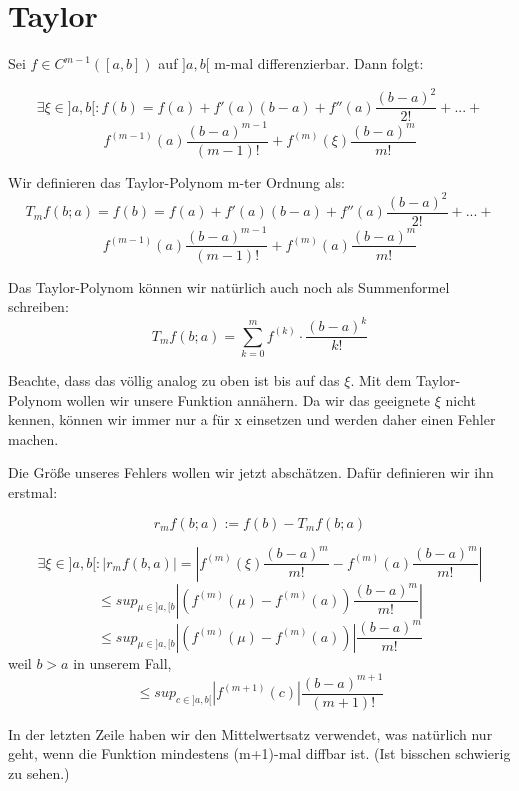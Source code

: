 \section{Taylor}

\begin{theorem}[Taylor]
Sei $f\in C^{m-1}([a,b])$ auf $]a,b[$ m-mal differenzierbar. Dann folgt:

$$\exists \xi \in ]a,b[:
f(b) = f(a) + f'(a)(b-a) + f''(a)\frac{(b-a)^2}{2!} + ... +$$
$$f^{(m-1)}(a)\frac{(b-a)^{m-1}}{(m-1)!} + f^{(m)}(\xi)\frac{(b-a)^m}{m!}$$
\end{theorem}

\begin{definition}
Wir definieren das Taylor-Polynom m-ter Ordnung als:
$$T_mf(b;a) = f(b) = f(a) + f'(a)(b-a) + f''(a)\frac{(b-a)^2}{2!} + ... +$$
$$f^{(m-1)}(a)\frac{(b-a)^{m-1}}{(m-1)!} + f^{(m)}(a)\frac{(b-a)^m}{m!}$$

Das Taylor-Polynom können wir natürlich auch noch als Summenformel schreiben:
$$T_mf(b;a) = \sum_{k=0}^m f^{(k)}\cdot\frac{(b-a)^k}{k!}$$

Beachte, dass das völlig analog zu oben ist bis auf das $\xi$.
Mit dem Taylor-Polynom wollen wir unsere Funktion annähern. Da wir das geeignete $\xi$ nicht kennen, können wir immer nur a für x einsetzen und werden daher einen Fehler machen.
\end{definition}

\begin{concept}
Die Größe unseres Fehlers wollen wir jetzt abschätzen.
Dafür definieren wir ihn erstmal:

$$r_mf(b;a) := f(b)-T_mf(b;a)$$

$$\exists \xi \in ]a,b[: |r_mf(b,a)| = |f^{(m)}(\xi)\frac{(b-a)^m}{m!}-f^{(m)}(a)\frac{(b-a)^m}{m!}|$$
$$\leq sup_{\mu \in ]a,[b}|(f^{(m)}(\mu)-f^{(m)}(a))\frac{(b-a)^m}{m!}|$$
$$\leq sup_{\mu \in ]a,[b}|(f^{(m)}(\mu)-f^{(m)}(a))|\frac{(b-a)^m}{m!}$$
weil $b>a$ in unserem Fall,
$$\leq sup_{c \in ]a,b[}|f^{(m+1)}(c)|\frac{(b-a)^{m+1}}{(m+1)!}$$

In der letzten Zeile haben wir den Mittelwertsatz verwendet, was natürlich nur geht, wenn die Funktion mindestens (m+1)-mal diffbar ist. (Ist bisschen schwierig zu sehen.)
\end{concept}


